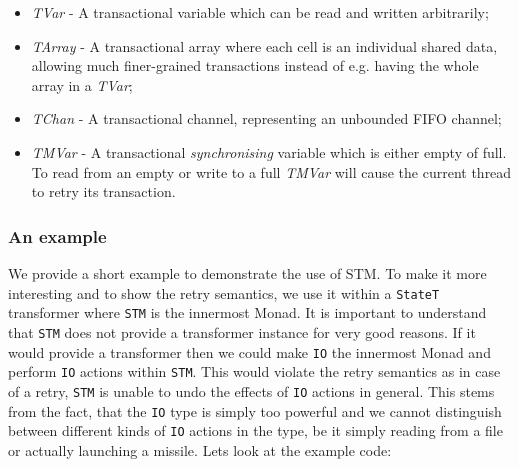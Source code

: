 \begin{itemize}
	\item \textit{TVar} - A transactional variable which can be read and written arbitrarily;
	\item \textit{TArray} - A transactional array where each cell is an individual shared data, allowing much finer-grained transactions instead of e.g. having the whole array in a \textit{TVar};
	\item \textit{TChan} - A transactional channel, representing an unbounded FIFO channel;
	\item \textit{TMVar} - A transactional \textit{synchronising} variable which is either empty of full. To read from an empty or write to a full \textit{TMVar} will cause the current thread to retry its transaction.
\end{itemize}


\subsubsection{An example}
We provide a short example to demonstrate the use of STM. To make it more interesting and to show the retry semantics, we use it within a \texttt{StateT} transformer where \texttt{STM} is the innermost Monad. It is important to understand that \texttt{STM} does not provide a transformer instance for very good reasons. If it would provide a transformer then we could make \texttt{IO} the innermost Monad and perform \texttt{IO} actions within \texttt{STM}. This would violate the retry semantics as in case of a retry, \texttt{STM} is unable to undo the effects of \texttt{IO} actions in general. This stems from the fact, that the \texttt{IO} type is simply too powerful and we cannot distinguish between different kinds of \texttt{IO} actions in the type, be it simply reading from a file or actually launching a missile. %
Lets look at the example code:

